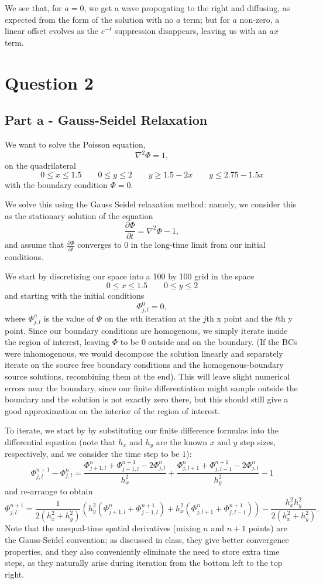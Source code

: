 \documentclass{article}
\begin{document}
We see that, for $a=0$, we get a wave propogating to the right and diffusing, as expected from the form of the solution with no $a$ term; but for $a$ non-zero, a linear offset evolves as the $e^{-t}$ suppression disappears, leaving us with an $ax$ term.

\section{Question 2}
\subsection{Part a - Gauss-Seidel Relaxation}
We want to solve the Poisson equation,
$$\nabla^2\Phi = 1,$$
on the quadrilateral
$$0 \leq x \leq 1.5 \qquad 0 \leq y \leq 2 \qquad y \geq 1.5-2x \qquad y \leq 2.75 - 1.5x$$
with the boundary condition $\Phi = 0$.

We solve this using the Gauss Seidel relaxation method; namely, we consider this as the stationary solution of the equation
$$\frac{\partial \Phi}{\partial t} = \nabla^2\Phi - 1,$$ 
and assume that $\frac{\partial \Phi}{\partial t}$ converges to 0 in the long-time limit from our initial conditions.

We start by discretizing our space into a 100 by 100 grid in the space
$$0 \leq x \leq 1.5 \qquad 0 \leq y \leq 2$$
and starting with the initial conditions
$$\Phi^0_{j,l} = 0,$$
 where $\Phi^n_{j,l}$ is the value of $\Phi$ on the $n$th iteration at the $j$th x point and the $l$th y point. Since our boundary conditions are homogenous, we simply iterate inside the region of interest, leaving $\Phi$ to be 0 outside and on the boundary. (If the BCs were inhomogenous, we would decompose the solution linearly and separately iterate on the source free boundary conditions and the homogenous-boundary source solutions, recombining them at the end). This will leave slight numerical errors near the boundary, since our finite differentiation might sample outside the boundary and the solution is not exactly zero there, but this should still give a good approximation on the interior of the region of interest.

To iterate, we start by by substituting our finite difference formulas into the differential equation (note that $h_x$ and $h_y$ are the known $x$ and $y$ step sizes, respectively, and we consider the time step to be $1$):
$$\Phi^{n+1}_{j,l} - \Phi^{n}_{j,l} = \frac{\Phi^{n}_{j+1,l} + \Phi^{n+1}_{j-1,l} - 2\Phi^{n}_{j,l}}{h_x^2} + \frac{\Phi^{n}_{j,l+1} + \Phi^{n+1}_{j,l-1} - 2\Phi^{n}_{j,l}}{h_y^2} - 1$$
and re-arrange to obtain
$$\Phi^{n+1}_{j,l} = \frac{1}{2(h_x^2 + h_y^2)}(h_y^2(\Phi^{n}_{j+1,l} + \Phi^{n+1}_{j-1,l}) + h_x^2(\Phi^{n}_{j,l+1} + \Phi^{n+1}_{j,l-1})) - \frac{h_x^2h_y^2}{2(h_x^2 + h_y^2)}.$$
Note that the unequal-time spatial derivatives (mixing $n$ and $n+1$ points) are the Gauss-Seidel convention; as discussed in class, they give better convergence properties, and they also conveniently eliminate the need to store extra time steps, as they naturally arise during iteration from the bottom left to the top right.
\end{document}
